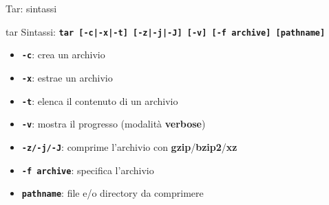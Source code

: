 \documentclass{beamer}
\begin{document}
    \begin{frame}{Tar: sintassi}
        \begin{block}{tar}
            \small
            Sintassi: \texttt{\textbf{tar [-c|-x|-t] [-z|-j|-J] [-v] [-f archive] [pathname]}}
            
            \begin{itemize}
                \item \texttt{\textbf{-c}}: crea un archivio
                \item \texttt{\textbf{-x}}: estrae un archivio
                \item \texttt{\textbf{-t}}: elenca il contenuto di un archivio
                \item \texttt{\textbf{-v}}: mostra il progresso (modalità \textbf{verbose})
                \item \texttt{\textbf{-z/-j/-J}}: comprime l'archivio con \textbf{gzip}/\textbf{bzip2}/\textbf{xz}
                \item \texttt{\textbf{-f archive}}: specifica l'archivio
                \item \texttt{\textbf{pathname}}: file e/o directory da comprimere
            \end{itemize}
        \end{block}
    \end{frame}
\end{document}
